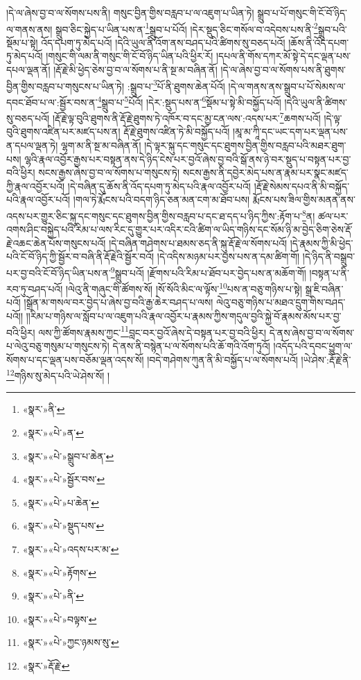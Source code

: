 །དེ་ལ་ཞེས་བྱ་བ་ལ་སོགས་པས་ནི། གསུང་བྱིན་གྱིས་བརླབ་པ་ལ་འཇུག་པ་ཡིན་ཏེ། སྒྲུབ་པ་པོ་གསུང་གི་ངོ་བོ་ཉིད་ལ་གནས་ནས། སྒྲུབ་ཅིང་སྐྱེད་པ་ཡིན་པས་ན་\footnote{«སྣར་»ནི་}སྒྲུབ་པ་པོའོ། །དེར་སྡུད་ཅིང་གསོལ་བ་འདེབས་པས་ནི་\footnote{«སྣར་»«པེ་»ན་}སྒྲུབ་པའི་སྡོམ་པ་སྟེ། འོད་དཔག་ཏུ་མེད་པའོ། །དེའི་ཡུལ་ནི་འོག་ནས་བཤད་པའི་ཚིགས་སུ་བཅད་པའོ། །ཆོས་ནི་འོད་དཔག་ཏུ་མེད་པའོ། །གསུང་གི་ལམ་ནི་གསུང་གི་ངོ་བོ་ཉིད་ཡིན་པའི་ཕྱིར་རོ། །དཔལ་ནི་གོས་དཀར་མོ་སྟེ་དེ་དང་ལྡན་པས་དཔལ་ལྡན་ནོ། །རྡོ་རྗེ་མི་ཕྱེད་ཅེས་བྱ་བ་ལ་སོགས་པ་ནི་སྔ་མ་བཞིན་ནོ། །དེ་ལ་ཞེས་བྱ་བ་ལ་སོགས་པས་ནི་ཐུགས་བྱིན་གྱིས་བརླབ་པ་གསུངས་པ་ཡིན་ཏེ། :སྒྲུབ་པ་\footnote{«སྣར་»«པེ་»སྒྲུབ་པ་ཆེན་}པོ་ནི་ཐུགས་ཆེན་པོའོ། །དེ་ལ་གནས་ནས་སྒྲུབ་པ་པོ་སེམས་ལ་དབང་ཐོབ་པ་ལ་:སྦྱོར་བས་ན་\footnote{«སྣར་»«པེ་»སྦྱོར་བས་}སྒྲུབ་པ་\footnote{«སྣར་»«པེ་»པ་ཆེན་}པོའོ། །དེར་:སྡུད་པས་ན་\footnote{«སྣར་»«པེ་»སྡུད་པས་}སྡོམ་པ་སྟེ་མི་བསྐྱོད་པའོ། །དེའི་ཡུལ་ནི་ཚིགས་སུ་བཅད་པའོ། །རྡོ་རྗེ་ལྟ་བུའི་ཐུགས་ནི་རྡོ་རྗེ་ཐུགས་ཏེ་འཁོར་བ་དང་མྱ་ངན་ལས་:འདས་པར་\footnote{«སྣར་»«པེ་»འདས་པར་མ་}ཆགས་པའོ། །དེ་ལྟ་བུའི་ཐུགས་འཛིན་པར་མཛད་པས་ན། རྡོ་རྗེ་ཐུགས་འཛིན་ཏེ་མི་བསྐྱོད་པའོ། །མཱ་མ་ཀཱི་དང་ཡང་དག་པར་ལྡན་པས་ན་དཔལ་ལྡན་ཏེ། ལྷག་མ་ནི་སྔ་མ་བཞིན་ནོ། །དེ་ལྟར་སྐུ་དང་གསུང་དང་ཐུགས་བྱིན་གྱིས་བརླབ་པའི་མཐར་ཐུག་པས། ལྷའི་རྣལ་འབྱོར་རྒྱས་པར་བསྟན་ནས་དེ་ཉིད་ངེས་པར་བྱའོ་ཞེས་བྱ་བའི་སྒོ་ནས་ཉེ་བར་སྡུད་པ་བསྟན་པར་བྱ་བའི་ཕྱིར། སངས་རྒྱས་ཞེས་བྱ་བ་ལ་སོགས་པ་གསུངས་ཏེ། སངས་རྒྱས་ནི་དབྱེར་མེད་པས་ན་རྣམ་པར་སྣང་མཛད་ཀྱི་རྣལ་འབྱོར་པའོ། །དེ་བཞིན་དུ་ཆོས་ནི་འོད་དཔག་ཏུ་མེད་པའི་རྣལ་འབྱོར་པའོ། །རྡོ་རྗེ་སེམས་དཔའ་ནི་མི་བསྐྱོད་པའི་རྣལ་འབྱོར་པའོ། །གལ་ཏེ་རྨོངས་པའི་བདག་ཉིད་ཅན་མན་ངག་མ་ཐོབ་པས། རྨོངས་པས་ཟིལ་གྱིས་མནན་ནས་འདས་པར་གྱུར་ཅིང་སྐུ་དང་གསུང་དང་ཐུགས་བྱིན་གྱིས་བརླབ་པ་དང་ཐ་དད་པ་ཉིད་ཀྱིས་:རྟོག་པ་\footnote{«སྣར་»«པེ་»རྟོགས་}ན། ཚལ་པར་འགས་ཤིང་བསྐྱེད་པའི་རིམ་པ་ལས་རིང་དུ་གྱུར་པར་འདིར་ངའི་ཚིག་ལ་ཡིད་གཉིས་དང་སོམ་ཉི་མ་བྱེད་ཅིག་ཅེས་རྡོ་རྗེ་འཆང་ཆེན་པོས་གསུངས་པའོ། །དེ་བཞིན་གཤེགས་པ་ཐམས་ཅད་ནི་སྐུ་རྡོ་རྗེ་ལ་སོགས་པའོ། །དེ་རྣམས་ཀྱི་མི་ཕྱེད་པའི་ངོ་བོ་ཉིད་ཀྱི་སྦྱོར་བ་བཞི་ནི་རྡོ་རྗེའི་སྦྱོར་བའོ། །དེ་འདིས་མཉམ་པར་བྱས་པས་ན་དམ་ཚིག་གོ། །དེ་ཉིད་ནི་བསྒྲུབ་པར་བྱ་བའི་ངོ་བོ་ཉིད་ཡིན་པས་ན་\footnote{«སྣར་»«པེ་»ནི་}སྒྲུབ་པའོ། །རྫོགས་པའི་རིམ་པ་ཐོབ་པར་བྱེད་པས་ན་མཆོག་གོ། །བསྟན་པ་ནི་རབ་ཏུ་བཤད་པའོ། །ལེའུ་ནི་གཞུང་གི་ཚོགས་སོ། །སོ་སོའི་མིང་ལ་ལྟོས་\footnote{«སྣར་»«པེ་»བལྟས་}པས་ན་བཅུ་གཉིས་པ་སྟེ། སྒྲ་ཇི་བཞིན་པའོ། །སྒྲོན་མ་གསལ་བར་བྱེད་པ་ཞེས་བྱ་བའི་རྒྱ་ཆེར་བཤད་པ་ལས། ལེའུ་བཅུ་གཉིས་པ་མཐའ་དྲུག་གིས་བཤད་པའོ།། །།རིམ་པ་གཉིས་ལ་སློབ་པ་ལ་འཇུག་པའི་རྣལ་འབྱོར་པ་རྣམས་ཀྱིས་གདུལ་བྱའི་སྐྱེ་བོ་རྣམས་མོས་པར་བྱ་བའི་ཕྱིར། ལས་ཀྱི་ཚོགས་རྣམས་ཀྱང་\footnote{«སྣར་»«པེ་»ཀྱང་ཉམས་སུ་}བླང་བར་བྱའོ་ཞེས་དེ་བསྟན་པར་བྱ་བའི་ཕྱིར། དེ་ནས་ཞེས་བྱ་བ་ལ་སོགས་པ་ལེའུ་བཅུ་གསུམ་པ་གསུངས་ཏེ། དེ་ནས་ནི་བསྙེན་པ་ལ་སོགས་པའི་ཆོ་གའི་འོག་ཏུའོ། །འདོད་པའི་དབང་ཕྱུག་ལ་སོགས་པ་དང་ལྡན་པས་བཅོམ་ལྡན་འདས་སོ། །བདེ་གཤེགས་ཀུན་ནི་མི་བསྐྱོད་པ་ལ་སོགས་པའོ། །ཡེ་ཤེས་:རྡོ་རྗེ་ནི་\footnote{«སྣར་»རྡོ་རྗེ་}གཉིས་སུ་མེད་པའི་ཡེ་ཤེས་སོ། །

